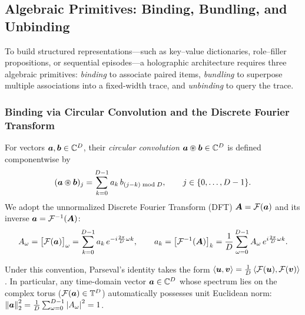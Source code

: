 \subsection{Algebraic Primitives: Binding, Bundling, and Unbinding}\label{sec:math:primitives}

To build structured representations---such as key--value dictionaries, role--filler propositions, or sequential episodes---a holographic architecture requires three algebraic primitives: \emph{binding} to associate paired items, \emph{bundling} to superpose multiple associations into a fixed-width trace, and \emph{unbinding} to query the trace.

\subsubsection{Binding via Circular Convolution and the Discrete Fourier Transform}

\begin{definition}\label{def:cconv_dft}
For vectors $\boldsymbol{a}, \boldsymbol{b} \in \mathbb{C}^D$, their \emph{circular convolution} $\boldsymbol{a} \circledast \boldsymbol{b} \in \mathbb{C}^D$ is defined componentwise by
\begin{equation}\label{eq:cconv_def}
    (\boldsymbol{a} \circledast \boldsymbol{b})_j = \sum_{k=0}^{D-1} a_k \, b_{(j - k) \bmod D}, \qquad j \in \{0, \dots, D-1\}.
\end{equation}
We adopt the unnormalized Discrete Fourier Transform (DFT) $\boldsymbol{A} = \mathcal{F}(\boldsymbol{a})$ and its inverse $\boldsymbol{a} = \mathcal{F}^{-1}(\boldsymbol{A})$:
\begin{equation}\label{eq:dft_def}
    A_\omega = \big[\mathcal{F}(\boldsymbol{a})\big]_\omega = \sum_{k=0}^{D-1} a_k \, e^{-i \frac{2\pi}{D}\omega k}, \qquad
    a_k = \big[\mathcal{F}^{-1}(\boldsymbol{A})\big]_k = \frac{1}{D} \sum_{\omega=0}^{D-1} A_\omega \, e^{i \frac{2\pi}{D}\omega k}.
\end{equation}
\end{definition}

Under this convention, Parseval's identity takes the form $\left\langle \boldsymbol{u}, \boldsymbol{v} \right\rangle = \frac{1}{D}\left\langle \mathcal{F}(\boldsymbol{u}), \mathcal{F}(\boldsymbol{v}) \right\rangle$.
In particular, any time-domain vector $\boldsymbol{a} \in \mathbb{C}^D$ whose spectrum lies on the complex torus ($\mathcal{F}(\boldsymbol{a}) \in \mathbb{T}^D$) automatically possesses unit Euclidean norm: $\left\lVert \boldsymbol{a} \right\rVert_2^2 = \frac{1}{D}\sum_{\omega=0}^{D-1}\left\lvert A_\omega \right\rvert^2 = 1$.

